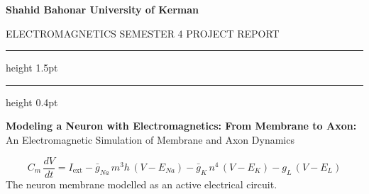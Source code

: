 \documentclass[12pt, a4paper]{article}
\begin{document}

\thispagestyle{empty}

\noindent
\begin{tcolorbox}[
  enhanced, colback=myblue, colframe=myblue,
  arc=0pt, boxrule=0pt,
  left=16pt, right=16pt, top=10pt, bottom=10pt,
  width=\linewidth,
]
  \centering
  {\small\bfseries\color{white} Shahid Bahonar University of Kerman}
\end{tcolorbox}

\vspace{0.6cm}

\begin{center}
  {\color{mygray}\small\MakeUppercase{Electromagnetics
    \;\textbullet\; Semester 4
    \;\textbullet\; Project Report}}
\end{center}

\vspace{0.3cm}
{\color{myborder}\hrule height 1.5pt}
\vspace{0.3cm}
{\color{myblue}\hrule height 0.4pt}
\vspace{1.2cm}

\begin{center}
  {\fontsize{24}{30}\bfseries\color{titlebg}
    Modeling a Neuron with Electromagnetics: From Membrane to Axon:}\\[10pt]
  {\large\color{mygray}
    An Electromagnetic Simulation of Membrane and Axon Dynamics}
\end{center}

\vspace{1.4cm}

\begin{formulabox}
  \centering
  \vspace{4pt}
  \[
    C_m\,\frac{dV}{dt}
      = I_{\text{ext}}
        - \bar{g}_{Na}\,m^3 h\,(V - E_{Na})
        - \bar{g}_K\,n^4\,(V - E_K)
        - g_L\,(V - E_L)
  \]
  \vspace{2pt}
  {\color{mygray}\small
    The neuron membrane modelled as an active electrical circuit.}
  \vspace{4pt}
\end{formulabox}
\end{document}
